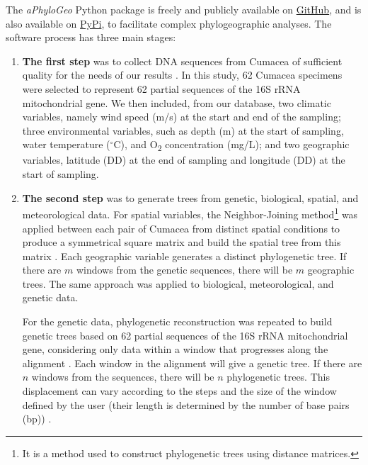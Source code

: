 The \textit{aPhyloGeo} Python package is freely and publicly available on \href{https://github.com/tahiri-lab/aPhyloGeo}{GitHub}, and is also available on \href{https://pypi.org/project/aphylogeo/}{PyPi}, to facilitate complex phylogeographic analyses. The software process has three main stages:

\begin{enumerate}
\item \textbf{The first step} was to collect DNA sequences from Cumacea of sufficient quality for the needs of our results \citep{li2024host, li2023aphylogeo, koshkarov_phylogeography_2022}. In this study, 62 Cumacea specimens were selected to represent 62 partial sequences of the 16S rRNA mitochondrial gene. We then included, from our database, two climatic variables, namely wind speed (m/s) at the start and end of the sampling; three environmental variables, such as depth (m) at the start of sampling, water temperature ($^\circ$C), and O\textsubscript{2} concentration (mg/L); and two geographic variables, latitude (DD) at the end of sampling and longitude (DD) at the start of sampling.

\item \textbf{The second step} was to generate trees from genetic, biological, spatial, and meteorological data. For spatial variables, the {Neighbor-Joining method}\footnote{It is a method used to construct phylogenetic trees using distance matrices.} was applied between each pair of Cumacea from distinct spatial conditions to produce a symmetrical square matrix and build the spatial tree from this matrix \citep{koshkarov_phylogeography_2022}. Each geographic variable generates a distinct phylogenetic tree. If there are $m$ windows from the genetic sequences, there will be $m$ geographic trees. The same approach was applied to biological, meteorological, and genetic data.

For the genetic data, phylogenetic reconstruction was repeated to build genetic trees based on 62 partial sequences of the 16S rRNA mitochondrial gene, considering only data within a window that progresses along the alignment \citep{li2024host, li2023aphylogeo, koshkarov_phylogeography_2022}. Each window in the alignment will give a genetic tree. If there are $n$ windows from the sequences, there will be $n$ phylogenetic trees. This displacement can vary according to the steps and the size of the window defined by the user (their length is determined by the number of base pairs (bp)) \citep{li2024host, li2023aphylogeo, koshkarov_phylogeography_2022}.


\end{enumerate}

